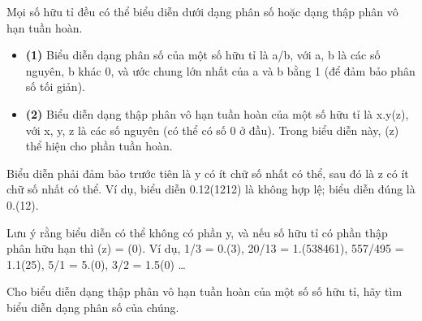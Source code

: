 Mọi số hữu tỉ đều có thể biểu diễn dưới dạng phân số hoặc dạng thập phân vô hạn tuần hoàn.  
\begin{itemize}
	\item \textbf{     (1)    }    Biểu diễn dạng phân số của một số hữu tỉ là a/b, với a, b là các số nguyên, b khác 0, và ước chung lớn nhất của a và b bằng 1 (để đảm bảo phân số tối giản).   
	\item \textbf{     (2)    }    Biểu diễn dạng thập phân vô hạn tuần hoàn của một số hữu tỉ là x.y(z), với x, y, z là các số nguyên (có thể có số 0 ở đầu). Trong biểu diễn này, (z) thể hiện cho phần tuần hoàn.   
\end{itemize}

   Biểu diễn phải đảm bảo trước tiên là y có ít chữ số nhất có thể, sau đó là z có ít chữ số nhất có thể. Ví dụ, biểu diễn 0.12(1212) là không hợp lệ; biểu diễn đúng là 0.(12).  

   Lưu ý rằng biểu diễn có thể không có phần y, và nếu số hữu tỉ có phần thập phân hữu hạn thì (z) = (0). Ví dụ, 1/3 = 0.(3), 20/13 = 1.(538461), 557/495 = 1.1(25), 5/1 = 5.(0), 3/2 = 1.5(0) …  

   Cho biểu diễn dạng thập phân vô hạn tuần hoàn của một số số hữu tỉ, hãy tìm biểu diễn dạng phân số của chúng.